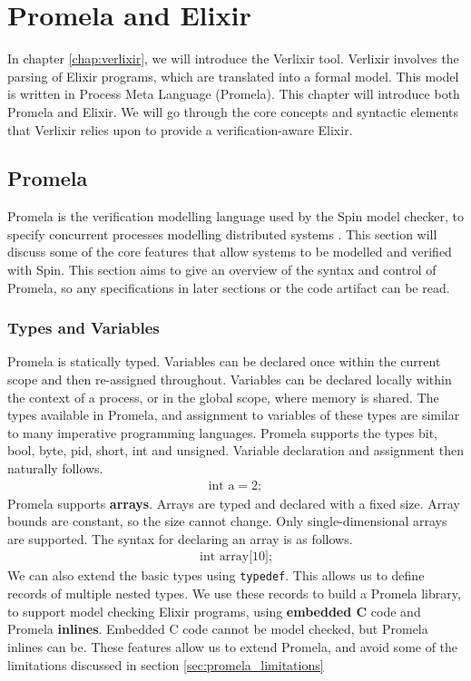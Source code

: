 \chapter{Promela and Elixir} \label{chap:promela_elixir}
In chapter \ref{chap:verlixir}, we will introduce the Verlixir tool. Verlixir involves the parsing of Elixir programs, which are translated into a formal model. This model is written in Process Meta Language (Promela). This chapter will introduce both Promela and Elixir. We will go through the core concepts and syntactic elements that Verlixir relies upon to provide a verification-aware Elixir. 
\section{Promela} \label{sec:promela}
Promela is the verification modelling language used by the Spin model checker, to specify concurrent processes modelling distributed systems \cite{spin}. This section will discuss some of the core features that allow systems to be modelled and verified with Spin. This section aims to give an overview of the syntax and control of Promela, so any specifications in later sections or the code artifact can be read.
\subsection{Types and Variables}
Promela is statically typed. Variables can be declared once within the current scope and then re-assigned throughout. Variables can be declared locally within the context of a process, or in the global scope, where memory is shared. The types available in Promela, and assignment to variables of these types are similar to many imperative programming languages. Promela supports the types bit, bool, byte, pid, short, int and unsigned. Variable declaration and assignment then naturally follows.
\[
\begin{aligned}
\text{int a} = 2;
\end{aligned}
\]
Promela supports \textbf{arrays}. Arrays are typed and declared with a fixed size. Array bounds are constant, so the size cannot change. Only single-dimensional arrays are supported. The syntax for declaring an array is as follows.
\[
\begin{aligned}
\text{int array[10];}
\end{aligned}
\]
We can also extend the basic types using \texttt{typedef}. This allows us to define records of multiple nested types. We use these records to build a Promela library, to support model checking Elixir programs, using \textbf{embedded C} code and Promela \textbf{inlines}. Embedded C code cannot be model checked, but Promela inlines can be. These features allow us to extend Promela, and avoid some of the limitations discussed in section \ref{sec:promela_limitations} 
